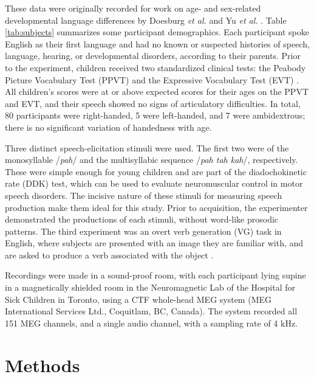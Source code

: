 \documentclass[a4paper]{article}
\begin{document}
These data were originally recorded for work on age- and sex-related developmental language differences by Doesburg \emph{et al.} and Yu \emph{et al.} \cite{Doesburg2016, Yu2014}. Table \ref{tab:subjects} summarizes some participant demographics. Each participant spoke English as their first language and had no known or suspected histories of speech, language, hearing, or developmental disorders, according to their parents. Prior to the experiment, children received two standardized clinical tests: the Peabody Picture Vocabulary Test (PPVT) \cite{Dunn97} and the Expressive Vocabulary Test (EVT) \cite{EVT}. All children's scores were at or above expected scores for their ages on the PPVT and EVT, and their speech showed no signs of articulatory difficulties. In total, 80 participants were right-handed, 5 were left-handed, and 7 were ambidextrous; there is no significant variation of handedness with age.

Three distinct speech-elicitation stimuli were used. The first two were of the monosyllable /{\em pah}/ and the multisyllabic sequence /{\em pah tah kah}/, respectively. These were simple enough for young children and are part of the diadochokinetic rate (DDK) test, which can be used to evaluate neuromuscular control in motor speech disorders. The incisive nature of these stimuli for measuring speech production make them ideal for this study. Prior to acquisition, the experimenter demonstrated the productions of each stimuli, without word-like prosodic patterns. The third experiment was an overt verb generation (VG) task in English, where subjects are presented with an image they are familiar with, and are asked to produce a verb associated with the object \cite{Doesburg2016}.

Recordings were made in a sound-proof room, with each participant lying supine in a magnetically shielded room in the Neuromagnetic Lab of the Hospital for Sick Children in Toronto, using a CTF whole-head MEG system (MEG International Services Ltd., Coquitlam, BC, Canada). The system recorded all 151 MEG channels, and a single audio channel, with a sampling rate of 4 kHz. %

\section{Methods}

\end{document}
